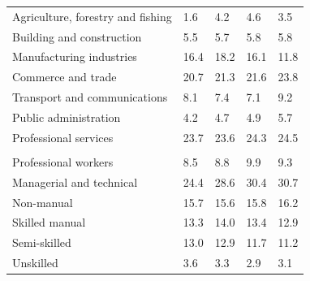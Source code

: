 \documentclass{article}
\begin{document}
\begin{table}[h]
\begin{tabular}{KTTTT}
    \hline
Agriculture, forestry and fishing  & 1.6& 4.2& 4.6& 3.5\\
Building and construction & 5.5& 5.7& 5.8& 5.8\\
Manufacturing industries & 16.4& 18.2& 16.1& 11.8\\
Commerce and trade  & 20.7& 21.3& 21.6& 23.8\\
Transport and communications  & 8.1& 7.4& 7.1& 9.2\\
Public administration & 4.2& 4.7& 4.9& 5.7\\
Professional services & 23.7& 23.6& 24.3& 24.5\\
\hline
    \\ 
    \hline
Professional workers  & 8.5& 8.8 & 9.9& 9.3\\
Managerial and technical & 24.4& 28.6& 30.4& 30.7\\
Non-manual & 15.7& 15.6& 15.8& 16.2\\
Skilled manual & 13.3& 14.0& 13.4& 12.9\\
Semi-skilled & 13.0& 12.9& 11.7& 11.2\\
Unskilled  & 3.6& 3.3& 2.9& 3.1\\
\end{tabular}
\end{table}
\pagebreak
\end{document}
